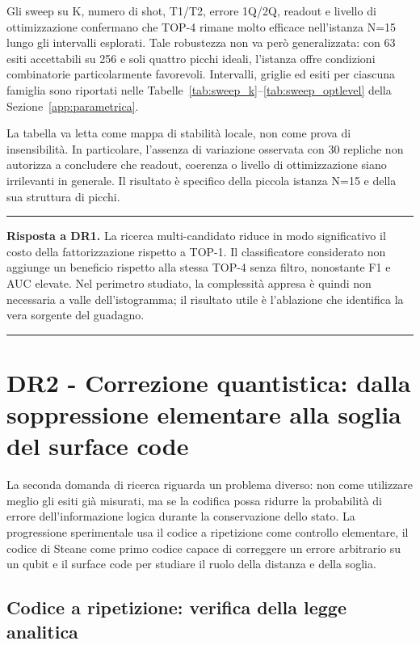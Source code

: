 Gli sweep su K, numero di shot, T1/T2, errore 1Q/2Q, readout e livello di ottimizzazione confermano che TOP-4 rimane molto efficace nell'istanza N=15 lungo gli intervalli esplorati. Tale robustezza non va però generalizzata: con 63 esiti accettabili su 256 e soli quattro picchi ideali, l'istanza offre condizioni combinatorie particolarmente favorevoli. Intervalli, griglie ed esiti per ciascuna famiglia sono riportati nelle Tabelle~\ref{tab:sweep_k}--\ref{tab:sweep_optlevel} della Sezione~\ref{app:parametrica}.

La tabella va letta come mappa di stabilità locale, non come prova di insensibilità. In particolare, l'assenza di variazione osservata con 30 repliche non autorizza a concludere che readout, coerenza o livello di ottimizzazione siano irrilevanti in generale. Il risultato è specifico della piccola istanza N=15 e della sua struttura di picchi.

\par\medskip\noindent\rule{\linewidth}{0.6pt}\par\nopagebreak
{\small{}\noindent \textbf{Risposta a DR1.} La ricerca multi-candidato riduce in modo significativo il costo della fattorizzazione rispetto a TOP-1. Il classificatore considerato non aggiunge un beneficio rispetto alla stessa TOP-4 senza filtro, nonostante F1 e AUC elevate. Nel perimetro studiato, la complessità appresa è quindi non necessaria a valle dell'istogramma; il risultato utile è l'ablazione che identifica la vera sorgente del guadagno.\par}
\nopagebreak\noindent\rule{\linewidth}{0.6pt}\par\medskip

\clearpage
\section{DR2 - Correzione quantistica: dalla soppressione elementare alla soglia del surface code}\label{sec:finale_5_2}

La seconda domanda di ricerca riguarda un problema diverso: non come utilizzare meglio gli esiti già misurati, ma se la codifica possa ridurre la probabilità di errore dell'informazione logica durante la conservazione dello stato. La progressione sperimentale usa il codice a ripetizione come controllo elementare, il codice di Steane come primo codice capace di correggere un errore arbitrario su un qubit e il surface code per studiare il ruolo della distanza e della soglia.

\subsection{Codice a ripetizione: verifica della legge analitica}\label{sec:finale_5_2_1}\label{sec:repetition}

